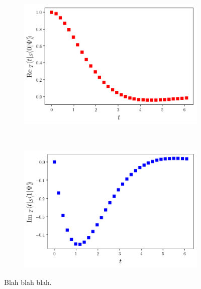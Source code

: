 \begin{figure}
  \centering
  \begin{subfigure}[b]{1.0\textwidth}
    \includegraphics[width=\linewidth]{img/2ldetect/re_psi0_t_pwlattice.png}
    \label{fig:aabsorbed-qubit-components_pwlattice:re0}
  \end{subfigure}
  \\
  \begin{subfigure}[b]{1.0\textwidth}
    \includegraphics[width=\linewidth]{img/2ldetect/im_psi1_t_pwlattice.png}
    \label{fig:aabsorbed-qubit-components_pwlattice:im1}
  \end{subfigure}
  \caption{
    Blah blah blah.
  }
  \label{fig:aabsorbed-qubit-components_pwlattice}
\end{figure}
